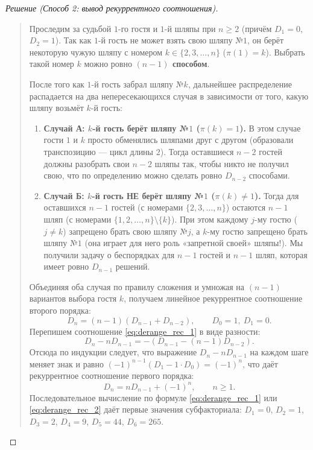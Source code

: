 \begin{proof}[Решение (Способ 2: вывод рекуррентного соотношения)]~\\
    \begin{quote}
        Проследим за судьбой $1$-го гостя и $1$-й шляпы при $n \ge 2$ 
        (причём $D_1 = 0$, $D_2 = 1$). Так как $1$-й гость не может взять 
        свою шляпу №$1$, он берёт некоторую чужую шляпу с номером 
        $k \in \{2, 3, \dots, n\}$ ($\pi(1) = k$). Выбрать такой номер $k$ 
        можно ровно \textbf{$(n - 1)$ способом}.

        После того как $1$-й гость забрал шляпу №$k$, дальнейшее 
        распределение распадается на два непересекающихся случая в 
        зависимости от того, какую шляпу возьмёт $k$-й гость:
        \begin{enumerate}
            \item \textbf{Случай А: $k$-й гость берёт шляпу №$1$ 
            ($\pi(k) = 1$).} 
            В этом случае гости $1$ и $k$ просто обменялись шляпами друг с 
            другом (образовали транспозицию --- цикл длины $2$). Тогда 
            оставшиеся $n - 2$ гостей должны разобрать свои $n - 2$ шляпы 
            так, чтобы никто не получил свою, что по определению можно 
            сделать ровно $D_{n-2}$ способами.
            \item \textbf{Случай Б: $k$-й гость НЕ берёт шляпу №$1$ 
            ($\pi(k) \neq 1$).} 
            Тогда для оставшихся $n - 1$ гостей (с номерами 
            $\{2, 3, \dots, n\}$) остаются $n - 1$ шляп (с номерами 
            $\{1, 2, \dots, n\} \setminus \{k\}$). При этом каждому 
            $j$-му гостю ($j \neq k$) запрещено брать свою шляпу №$j$, а 
            $k$-му гостю запрещено брать шляпу №$1$ (она играет для него 
            роль «запретной своей» шляпы!). Мы получили задачу о 
            беспорядках для $n - 1$ гостей и $n - 1$ шляп, которая имеет 
            ровно $D_{n-1}$ решений.
        \end{enumerate}
        Объединяя оба случая по правилу сложения и умножая на $(n - 1)$ 
        вариантов выбора гостя $k$, получаем линейное рекуррентное 
        соотношение второго порядка:
        \begin{equation} \label{eq:derange_rec_1}
            D_n = (n - 1)(D_{n-1} + D_{n-2}), \qquad D_0 = 1, \ D_1 = 0. \tag{12}
        \end{equation}
        Перепишем соотношение \eqref{eq:derange_rec_1} в виде разности:
        \[
            D_n - n D_{n-1} = -(D_{n-1} - (n - 1)D_{n-2}).
        \]
        Отсюда по индукции следует, что выражение $D_n - n D_{n-1}$ на 
        каждом шаге меняет знак и равно $(-1)^{n-1}(D_1 - 1 \cdot D_0) = (-1)^n$, 
        что даёт рекуррентное соотношение первого порядка:
        \begin{equation} \label{eq:derange_rec_2}
            D_n = n D_{n-1} + (-1)^n, \qquad n \ge 1. \tag{13}
        \end{equation}
        Последовательное вычисление по формуле \eqref{eq:derange_rec_1} 
        или \eqref{eq:derange_rec_2} даёт первые значения субфакториала: 
        $D_1 = 0$, $D_2 = 1$, $D_3 = 2$, $D_4 = 9$, $D_5 = 44$, $D_6 = 265$.
    \end{quote}
\end{proof}